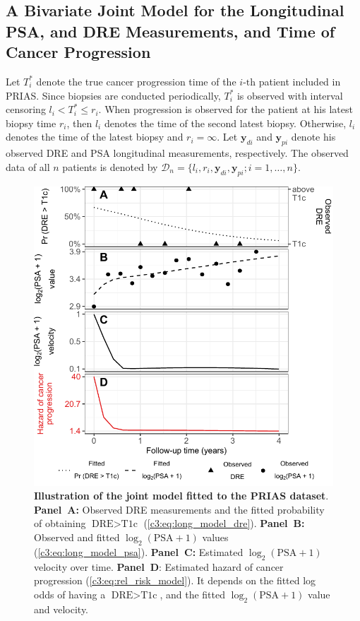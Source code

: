 \subsection{A Bivariate Joint Model for the Longitudinal PSA, and DRE Measurements, and Time of Cancer Progression}
Let $T_i^*$ denote the true cancer progression time of the ${i\mbox{-th}}$ patient included in PRIAS. Since biopsies are conducted periodically, $T_i^*$ is observed with interval censoring ${l_i < T_i^* \leq r_i}$. When progression is observed for the patient at his latest biopsy time $r_i$, then $l_i$ denotes the time of the second latest biopsy. Otherwise, $l_i$ denotes the time of the latest biopsy and ${r_i=\infty}$. Let $\boldsymbol{y}_{di}$ and $\boldsymbol{y}_{pi}$ denote his observed DRE and PSA longitudinal measurements, respectively. The observed data of all $n$ patients is denoted by ${\mathcal{D}_n = \{l_i, r_i, \boldsymbol{y}_{di}, \boldsymbol{y}_{pi}; i = 1, \ldots, n\}}$.

\begin{figure}
\includegraphics{contents/c3/images/c3_fig3.pdf}
\caption{\textbf{Illustration of the joint model fitted to the PRIAS dataset}. \textbf{Panel~A:} Observed DRE measurements and the fitted probability of obtaining $\mbox{DRE} > \mbox{T1c}$ (\ref{c3:eq:long_model_dre}). \textbf{Panel~B:} Observed and fitted $\log_2(\mbox{PSA} + 1)$ values (\ref{c3:eq:long_model_psa}). \textbf{Panel~C:} Estimated $\log_2(\mbox{PSA} + 1)$ velocity over time. \textbf{Panel~D}: Estimated hazard of cancer progression (\ref{c3:eq:rel_risk_model}). It depends on the fitted log odds of having a $\mbox{DRE} > \mbox{T1c}$, and the fitted $\log_2(\mbox{PSA} + 1)$ value and velocity.}
\label{c3:fig:3}
\end{figure}


